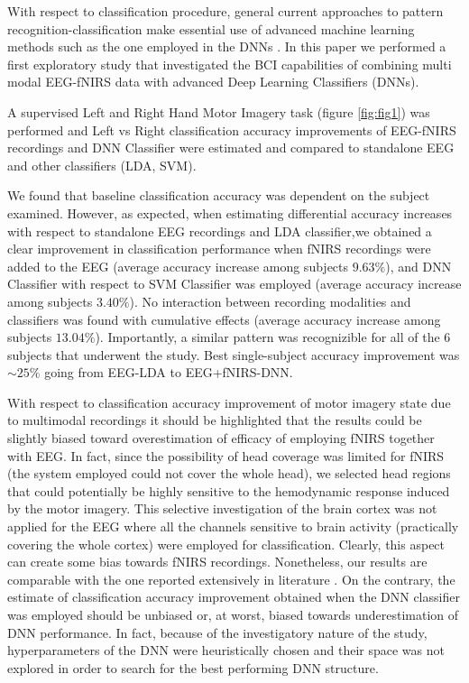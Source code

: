 \documentclass[12pt]{iopart}
\begin{document}
 With respect to classification procedure, general current approaches to pattern recognition-classification  make essential use of advanced machine learning methods such as the one employed in the DNNs \parencite{lecun2015deep}. 
In this paper we performed a first exploratory study that investigated the BCI capabilities of combining multi modal EEG-fNIRS data  with advanced Deep Learning Classifiers (DNNs). 

 A supervised Left and Right Hand Motor Imagery task (figure \ref{fig:fig1}) was performed and Left vs Right classification accuracy improvements of EEG-fNIRS recordings and DNN Classifier were estimated and compared to standalone EEG and other classifiers (LDA, SVM).

We found that baseline classification accuracy was dependent on the subject examined. However, as expected, when estimating differential accuracy increases  with respect to standalone EEG recordings and LDA classifier,we obtained a clear improvement in classification performance when fNIRS recordings were added to the EEG (average accuracy increase among subjects $9.63\%$), and DNN Classifier with respect to SVM Classifier was employed (average accuracy increase among subjects $3.40\%$).  No interaction between recording modalities and classifiers was found with cumulative effects (average accuracy increase among subjects $13.04\%$). Importantly, a similar pattern was recognizible for all of the 6 subjects that underwent the study. Best single-subject accuracy  improvement was $\sim25\%$ going from EEG-LDA to EEG+fNIRS-DNN. 

With respect to classification accuracy improvement of motor imagery state due to  multimodal recordings it should be highlighted that the results could be slightly biased toward overestimation of efficacy of employing fNIRS together with EEG. In fact, since the possibility of head coverage was limited for fNIRS (the system employed could not cover the whole head), we  selected head regions that could potentially be highly sensitive to the hemodynamic response induced by the motor imagery. This selective investigation of the brain cortex was not applied for the EEG  where all the channels sensitive to brain activity (practically covering the whole cortex) were employed for classification. Clearly, this aspect can create some bias towards fNIRS recordings. Nonetheless, our results are comparable  with the one reported extensively in literature  \parencite{ma2012hybrid, lee2014hybrid, buccino2016hybrid, khan2014decoding, khan2017hybrid}. On the contrary,  the estimate of classification accuracy improvement obtained when the DNN classifier was employed should be unbiased or, at worst, biased towards underestimation of DNN performance. In fact, because of the investigatory nature of the study, hyperparameters of the DNN were heuristically chosen and their space was not explored in order to search for the best performing DNN structure.
 
\end{document}
